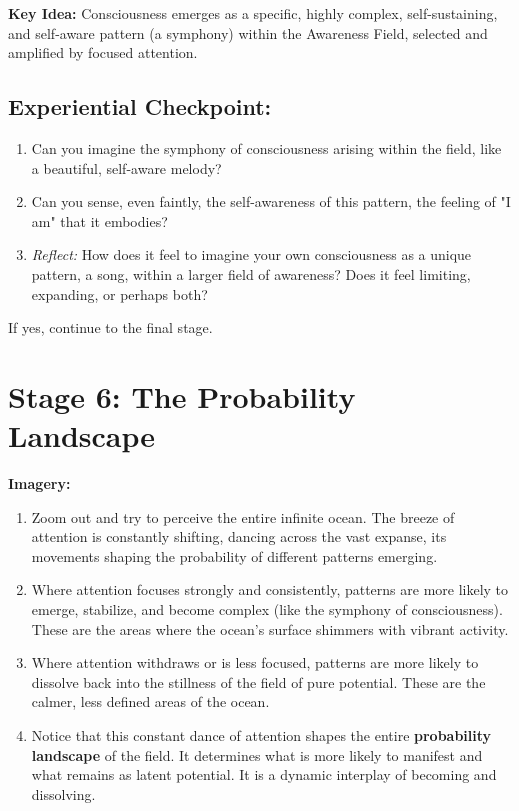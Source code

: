 \documentclass[12pt,a4paper]{article}
\begin{document}
\textbf{Key Idea:} Consciousness emerges as a specific, highly complex, self-sustaining, and self-aware pattern (a symphony) within the Awareness Field, selected and amplified by focused attention.

\subsection*{Experiential Checkpoint:}
\begin{enumerate}
    \item Can you imagine the symphony of consciousness arising within the field, like a beautiful, self-aware melody?
    \item Can you sense, even faintly, the self-awareness of this pattern, the feeling of "I am" that it embodies?
    \item \textit{Reflect:} How does it feel to imagine your own consciousness as a unique pattern, a song, within a larger field of awareness? Does it feel limiting, expanding, or perhaps both?
\end{enumerate}

If yes, continue to the final stage.

\section*{Stage 6: The Probability Landscape}

\textbf{Imagery:}
\begin{enumerate}
    \item Zoom out and try to perceive the entire infinite ocean. The breeze of attention is constantly shifting, dancing across the vast expanse, its movements shaping the probability of different patterns emerging.
    \item Where attention focuses strongly and consistently, patterns are more likely to emerge, stabilize, and become complex (like the symphony of consciousness). These are the areas where the ocean's surface shimmers with vibrant activity.
    \item Where attention withdraws or is less focused, patterns are more likely to dissolve back into the stillness of the field of pure potential. These are the calmer, less defined areas of the ocean.
    \item Notice that this constant dance of attention shapes the entire \textbf{probability landscape} of the field. It determines what is more likely to manifest and what remains as latent potential. It is a dynamic interplay of becoming and dissolving.
\end{enumerate}
\end{document}
